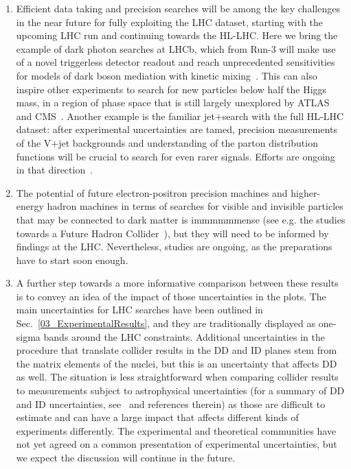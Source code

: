 \begin{issues}
\begin{enumerate}
\begin{itemize}

\end{itemize} 

\item Efficient data taking and precision searches will be among the key challenges in the near future for fully exploiting the LHC dataset, starting with the upcoming LHC run and continuing towards the HL-LHC. Here we bring the example of dark photon searches at LHCb, which from Run-3 will make use of a novel triggerless detector readout and reach unprecedented sensitivities for models of dark boson mediation with kinetic mixing~\cite{Ilten:2016tkc}. This can also inspire other experiments to search for new particles below half the Higgs mass, in a region of phase space that is still largely unexplored by ATLAS and CMS~\cite{Alves:2016cqf}. Another example is the familiar jet+\MET search with the full HL-LHC dataset: after experimental uncertainties are tamed, precision measurements of the V+jet backgrounds and understanding of the parton distribution functions will be crucial to search for even rarer signals. Efforts are ongoing in that direction~\cite{Blumenschein:2018gtm}. 


\item The potential of future electron-positron precision machines and higher-energy hadron machines in terms of searches for visible and invisible particles that may be connected to dark matter is immmmmmense (see e.g. the studies towards a Future Hadron Collider~\cite{Golling:2016gvc}), but they will need to be informed by findings at the LHC. Nevertheless, studies are ongoing, as the preparations have to start soon enough. 

\item A further step towards a more informative comparison between these results is to convey an idea of the impact of those uncertainties in the plots. 
The main uncertainties for LHC searches have been outlined in Sec.~\ref{03_ExperimentalResults}, and they are traditionally displayed as one-sigma bands around the LHC constraints. 
Additional uncertainties in the procedure that translate collider results in the DD and ID planes stem from the matrix elements of the nuclei, but this is an uncertainty that affects DD as well. %
The situation is less straightforward when comparing collider results to measurements subject to astrophysical uncertainties (for a summary of DD and ID uncertainties, see~\cite{Feldstein:2014ufa,d300ef23986a49099715e661295a4d72} and references therein) as those are difficult to estimate and can have a large impact that affects different kinds of experiments differently. 
The experimental and theoretical communities have not yet agreed on a common presentation of experimental uncertainties, but we expect the discussion will continue in the future. 


\end{enumerate}
\end{issues}
